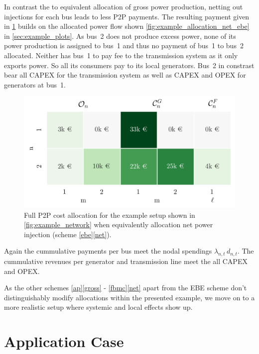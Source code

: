 \documentclass[11pt,twocolumn]{article}
\newcommand{\lmp}[1][n]{\lambda_{#1,t}}
\newcommand{\demand}[1][n]{d_{#1,t}}
\begin{document}
In contrast the to equivalent allocation of gross power production, netting out injections for each bus leads to less P2P payments. The resulting payment given in \cref{fig:example_payoff_net_ebe} builds on the allocated power flow shown \cref{fig:example_allocation_net_ebe} in \cref{sec:example_plots}. As bus~2 does not produce excess power, none of its power production is assigned to bus~1 and thus no payment of bus~1 to bus~2 allocated. Neither has bus~1 to pay fee to the transmission system as it only exports power. So all its consumers pay to its local generators. Bus~2 in constrast bear all CAPEX for the transmission system as well as CAPEX and OPEX for generators at bus~1.
\begin{figure}[h]
\centering
\includegraphics[width=\linewidth]{example_payoff_net_ebe.png}
\caption{Full P2P cost allocation for the example setup shown in \cref{fig:example_network} when equivalently allocation net power injection (scheme \ref{ebe}\ref{net}).}
\label{fig:example_payoff_net_ebe}
\end{figure}

Again the cummulative payments per bus meet the nodal spendings $\lmp \, \demand$. The cummulative revenues per generator and transmission line meet the all CAPEX and OPEX.  

As the other schemes \ref{ap}\ref{gross} - \ref{fbmc}\ref{net} apart from the EBE scheme don't distinguishably modify allocations within the presented example, we move on to a more realistic setup where systemic and local effects show up.


\section{Application Case}



\clearpage
\appendix
\end{document}
